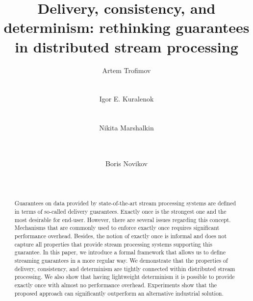 \documentclass{vldb}
\theoremstyle{definition}
\begin{document}
\title {Delivery, consistency, and determinism: rethinking guarantees in distributed stream processing}


\author{
\alignauthor
Artem Trofimov\\
       \\
       \\
\alignauthor
Igor E. Kuralenok\\
       \\
       \\
\alignauthor 
Nikita Marshalkin\\
       \\
       \\
\and  %
\alignauthor 
Boris Novikov\\
       \\
       \\
}

\maketitle

\begin{abstract}
Guarantees on data provided by state-of-the-art stream processing systems are defined in terms of so-called delivery guarantees. Exactly once is the strongest one and the most desirable for end-user. However, there are several issues regarding this concept. Mechanisms that are commonly used to enforce exactly once requires significant performance overhead. Besides, the notion of exactly once is informal and does not capture all properties that provide stream processing systems supporting this guarantee. In this paper, we introduce a formal framework that allows us to define streaming guarantees in a more regular way. We demonstrate that the properties of delivery, consistency, and determinism are tightly connected within distributed stream processing. We also show that having lightweight determinism it is possible to provide exactly once with almost no performance overhead. Experiments show that the proposed approach can significantly outperform an alternative industrial solution.
\end{abstract}
\end{document}
